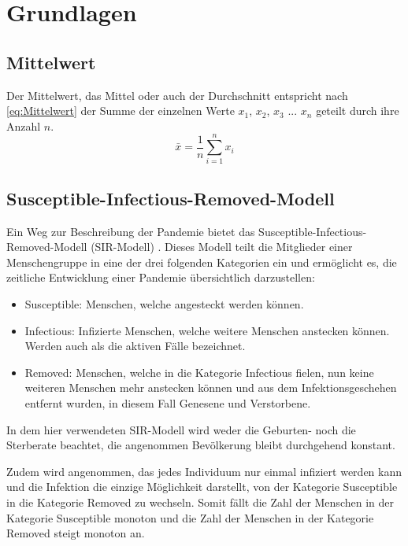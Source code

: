 \chapter{Grundlagen}\label{chap:Grundlagen}
\section{Mittelwert}\label{sec:Grundlagen:Mittelwert}
Der Mittelwert, das Mittel oder auch der Durchschnitt entspricht nach \autoref{eq:Mittelwert} der Summe der einzelnen Werte $x_1$, $x_2$, $x_3$ ... $x_n$ geteilt durch ihre Anzahl $n$.
\begin{equation}\label{eq:Mittelwert}
    \bar x = \frac{1}{n}\sum_{i=1}^n x_i
\end{equation}

\section{Susceptible-Infectious-Removed-Modell}\label{sec:Grundlagen:SIR}
Ein Weg zur Beschreibung der Pandemie bietet das \glqq{}Susceptible-Infectious-Removed-Modell\grqq{} (SIR-Modell) \autocite{SIR}. Dieses Modell teilt die Mitglieder einer Menschengruppe in eine der drei folgenden Kategorien ein und ermöglicht es, die zeitliche Entwicklung einer Pandemie übersichtlich darzustellen:
\begin{itemize}
    \item \glqq{}Susceptible\grqq{}: Menschen, welche angesteckt werden können.
    \item \glqq{}Infectious\grqq{}: Infizierte Menschen, welche weitere Menschen anstecken können. Werden auch als \glqq{}die aktiven Fälle\grqq{} bezeichnet.
    \item \glqq{}Removed\grqq{}: Menschen, welche in die Kategorie \glqq{}Infectious\grqq{} fielen, nun keine weiteren Menschen mehr anstecken können und aus dem Infektionsgeschehen entfernt wurden,
    in diesem Fall Genesene und Verstorbene. 
\end{itemize}
In dem hier verwendeten SIR-Modell wird weder die Geburten- noch die Sterberate beachtet, die angenommen Bevölkerung bleibt durchgehend konstant.

Zudem wird angenommen, das jedes Individuum nur einmal infiziert werden kann und die Infektion die einzige Möglichkeit darstellt, von der Kategorie \glqq{}Susceptible\grqq{} in die Kategorie \glqq{}Removed\grqq{} zu wechseln.
Somit fällt die Zahl der Menschen in der Kategorie \glqq{}Susceptible\grqq{} monoton und die Zahl der Menschen in der Kategorie \glqq{}Removed\grqq{} steigt monoton an.

